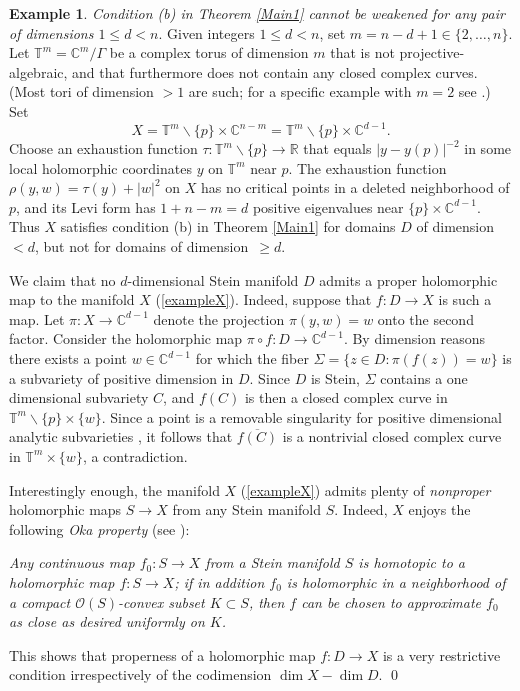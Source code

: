 \documentclass[11pt]{amsart}
\numberwithin{equation}{section}
\theoremstyle{definition}
\newtheorem{example}[theorem]{Example}
\begin{document}
\begin{example} 
\label{Counterex}
{\em Condition (b) in Theorem \ref{Main1}
cannot be weakened for any pair of dimensions $1\le d<n$}.
Given integers $1\le d<n$, set $m=n-d+1\in \{2,\ldots,n\}$.
Let ${\mathbb{T}}^m={\mathbb{C}}^m/\varGamma$ be a complex torus of dimension $m$ 
that is not projective-algebraic, and that furthermore 
does not contain any closed complex curves. (Most tori of dimension 
$>1$ are such; for a specific example with $m=2$ see 
\cite[p.\ 222]{Wells}.) Set
\begin{equation}
\label{exampleX}
	X ={\mathbb{T}}^m{\backslash} \{p\} \times {\mathbb{C}}^{n-m}= {\mathbb{T}}^m{\backslash} \{p\} \times {\mathbb{C}}^{d-1}.
\end{equation}
Choose an exhaustion function $\tau \colon {\mathbb{T}}^m{\backslash} \{p\}\to {\mathbb{R}}$ 
that equals $|y-y(p)|^{-2}$ in some local holomorphic coordinates 
$y$ on ${\mathbb{T}}^m$ near $p$.  The exhaustion function $\rho(y,w)= \tau(y)+ |w|^2$ on $X$ 
has no critical points in a deleted neighborhood of $p$, 
and its Levi form has $1+n-m=d$ positive eigenvalues near $\{p\}\times{\mathbb{C}}^{d-1}$.
Thus $X$ satisfies condition (b) in Theorem  \ref{Main1} for 
domains $D$ of dimension $<d$, but not for domains of dimension~$\ge d$.

We claim that no $d$-dimensional Stein manifold $D$ admits
a proper holomorphic map to the manifold $X$ (\ref{exampleX}).
Indeed, suppose that $f\colon D\to X$ is such a map.
Let $\pi\colon X\to {\mathbb{C}}^{d-1}$ denote the projection $\pi(y,w)=w$
onto the second factor. Consider the holomorphic map
$\pi\circ f\colon D\to{\mathbb{C}}^{d-1}$.
By dimension reasons there exists a point $w\in {\mathbb{C}}^{d-1}$ 
for which the fiber $\Sigma=\{z\in D\colon \pi(f(z))=w\}$ 
is a subvariety of positive dimension in $D$.
Since $D$ is Stein, $\Sigma$ contains a one dimensional subvariety $C$, 
and $f(C)$ is then a closed complex curve in ${\mathbb{T}}^m{\backslash} \{p\}\times \{w\}$.
Since a point is a removable singularity for positive dimensional 
analytic subvarieties \cite{RS}, it follows that $\overline{f(C)}$
is a nontrivial closed complex curve in ${\mathbb{T}}^m\times \{w\}$, 
a contradiction.

Interestingly enough, the manifold $X$ (\ref{exampleX}) admits plenty
of {\em nonproper} holomorphic maps $S\to X$ from any Stein manifold
$S$.  Indeed, $X$ enjoys the following {\em Oka property} 
(see \cite[Corollary 1.5 (ii)]{ANN}): 

{\em Any continuous map $f_0\colon S\to X$ from a Stein manifold $S$
is homotopic to a holomorphic map $f\colon S\to X$;
if in addition $f_0$ is holomorphic in a neighborhood of a 
compact ${\mathcal{O}}(S)$-convex subset $K\subset S$, then $f$ can be chosen 
to approximate $f_0$ as close as desired uniformly on $K$.}

This shows that properness of a holomorphic map
$f\colon D\to X$ is a very restrictive condition 
irrespectively of the codimension $\dim X - \dim D$.
\qed \end{example}
 
\end{document}
